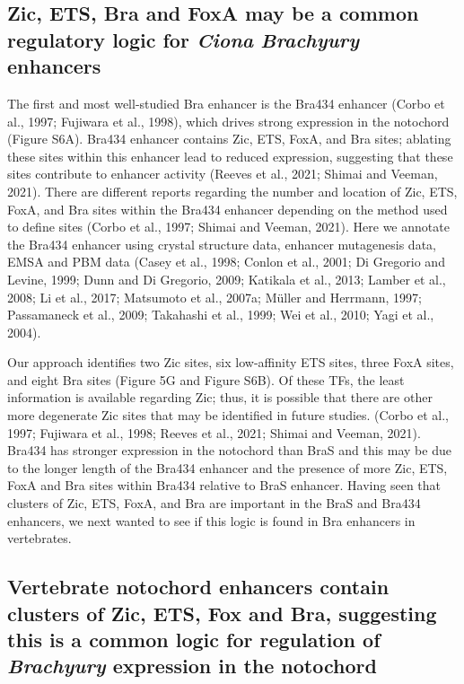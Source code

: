 \subsection{Zic, ETS, Bra and FoxA may be a common regulatory logic for \textit{Ciona} \textit{Brachyury} enhancers}

The first and most well-studied Bra enhancer is the Bra434 enhancer (Corbo et al., 1997; Fujiwara et al., 1998), which drives strong expression in the notochord (Figure S6A).  Bra434 enhancer contains Zic, ETS, FoxA, and Bra sites; ablating these sites within this enhancer lead to reduced expression, suggesting that these sites contribute to enhancer activity (Reeves et al., 2021; Shimai and Veeman, 2021). There are different reports regarding the number and location of Zic, ETS, FoxA, and Bra sites within the Bra434 enhancer depending on the method used to define sites (Corbo et al., 1997; Shimai and Veeman, 2021). Here we annotate the Bra434 enhancer using crystal structure data, enhancer mutagenesis data, EMSA and PBM data (Casey et al., 1998; Conlon et al., 2001; Di Gregorio and Levine, 1999; Dunn and Di Gregorio, 2009; Katikala et al., 2013; Lamber et al., 2008; Li et al., 2017; Matsumoto et al., 2007a; Müller and Herrmann, 1997; Passamaneck et al., 2009; Takahashi et al., 1999; Wei et al., 2010; Yagi et al., 2004). 

Our approach identifies two Zic sites, six low-affinity ETS sites, three FoxA sites, and eight Bra sites (Figure 5G and Figure S6B). Of these TFs, the least information is available regarding Zic; thus, it is possible that there are other more degenerate Zic sites that may be identified in future studies. (Corbo et al., 1997; Fujiwara et al., 1998; Reeves et al., 2021; Shimai and Veeman, 2021). Bra434 has stronger expression in the notochord than BraS and this may be due to the longer length of the Bra434 enhancer and the presence of more Zic, ETS, FoxA and Bra sites within Bra434 relative to BraS enhancer. Having seen that clusters of Zic, ETS, FoxA, and Bra are important in the BraS and Bra434 enhancers, we next wanted to see if this logic is found in Bra enhancers in vertebrates.

\subsection{Vertebrate notochord enhancers contain clusters of Zic, ETS, Fox and Bra, suggesting this is a common logic for regulation of \textit{Brachyury} expression in the notochord}

